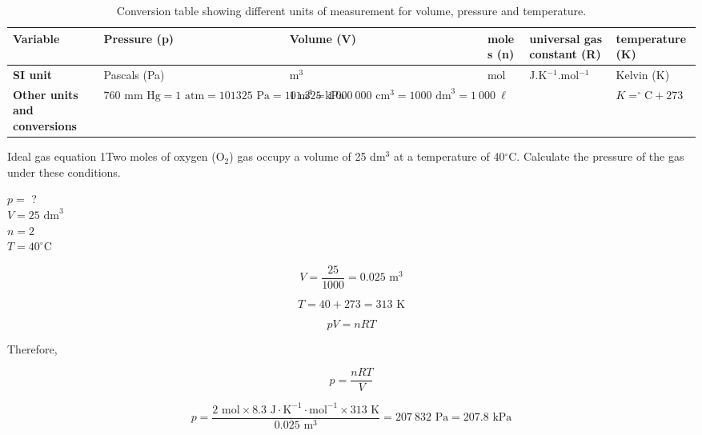 \begin{table}[h]
\begin{center}
\begin{tabular}{|p{2cm}|p{2cm}|p{2cm}|p{1.5cm}|p{2cm}|p{2cm}|}\hline
\textbf{Variable} & Pressure (\textbf{p}) & Volume (\textbf{V}) & moles (\textbf{n}) & universal gas constant (\textbf{R}) & temperature (\textbf{K})\\\hline
\textbf{SI unit} & Pascals (Pa) & m$^{3}$ & mol & J.K$^{-1}$.mol$^{-1}$ & Kelvin (K) \\\hline
\textbf{Other units and conversions} & $760 \text{ mm Hg} = 1 \text{ atm} = 101325 \text{ Pa} = 101.325 \text{ kPa}$ & $1 \text{ m}^{3} = 1~000~000 \text{ cm}^{3} = 1000 \text{ dm}^{3} = 1~000 ~\ell$ &  &  & $K = ^{\circ}\text{C} + 273$ \\\hline
\end{tabular}
\caption{Conversion table showing different units of measurement for volume, pressure and temperature.}
\label{tab:gas:units}
\end{center}
\end{table}
\begin{wex}{Ideal gas equation 1}{Two moles of oxygen (O$_{2}$) gas occupy a volume of 25 dm$^{3}$ at a temperature of 40$^{\circ}$C. Calculate the pressure of the gas under these conditions.}{

$p =$ ? \\
$V = 25 \text{ dm}^{3}$\\
$n = 2$\\
$T = 40^{\circ}$C


\begin{equation*}
V = \frac{25}{1000} = 0.025 \text{ m}^{3}
\end{equation*}

\begin{equation*}
T = 40 + 273 = 313 \text{ K}
\end{equation*}

\begin{equation*}
pV = nRT
\end{equation*}

Therefore,

\begin{equation*}
p = \frac{nRT}{V}
\end{equation*}

\begin{equation*}
p = \frac{2 \text{ mol} \times 8.3 \text{ J} \cdot \text{K}^{-1} \cdot \text{mol}^{-1} \times 313 \text{ K}}{0.025 \text{ m}^{3}} = 207~832 \text{ Pa} = 207.8 \text{ kPa}
\end{equation*}
}
\end{wex}

